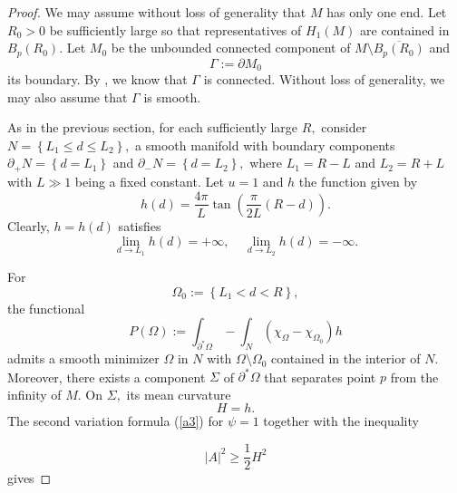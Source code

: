 \documentclass{amsart}
\numberwithin{equation}{section}
\begin{document}
\begin{proof}
We may assume without loss of generality that $M$ has only one end.  Let $R_0>0$ be sufficiently large so that representatives of $H_1 (M)$ are
contained in $B_p(R_0)$. Let $M_0$ be the unbounded connected component of $M\setminus \overline{ B_p (R_0)}$ and  $$\Gamma:= \partial M_0$$ its boundary. By \cite{LT}, we know that $\Gamma$ is connected. Without loss of generality, we may also assume that $\Gamma$ is smooth.  

 As in the previous section, for each sufficiently large $R,$ 
consider $N=\left\{ L_1\leq d\leq L_2\right\},$ 
a smooth manifold with boundary components $\partial _{+}N=\left\{d=L_1\right\} $ and 
$\partial _{-}N=\left\{ d=L_2\right\},$ where $L_1=R-L$ and $L_2=R+L$ with $L\gg 1$ being 
a fixed constant. Let $u=1$ and  $h$ the function given by
\begin{equation*}
h\left( d\right) =\frac{4\pi }{L}\tan \left( \frac{\pi }{2L}(R-d)\right). 
\end{equation*}
Clearly,   $h=h\left( d\right) $ satisfies
\begin{equation*}
\lim_{d\rightarrow L_1}h\left( d\right) =+\infty ,\ \ \ \ \
\lim_{d\rightarrow L_2}h\left( d\right) =-\infty .
\end{equation*}

For 
\begin{equation*}
\Omega _{0}:=\left\{ L_1<d<R\right\}, 
\end{equation*}
the functional
\begin{equation*}
P\left( \Omega \right) :=\int_{\partial ^{\ast }\Omega }-\int_{N}\left( \chi
_{\Omega }-\chi _{\Omega _{0}}\right) h
\end{equation*}
admits a smooth minimizer $\Omega$ in $N$ with $\Omega\setminus \Omega_0$ contained in the 
interior of $N.$ Moreover, there exists a component $\Sigma$ of  $\partial ^{\ast }\Omega$
that separates point $p$ from the infinity of $M.$ 
On $\Sigma,$ its mean curvature
\begin{equation}
H=h.  \label{z0}
\end{equation}
The second variation formula (\ref{a3}) for $\psi =1$ together with the inequality 

\begin{equation*}
|A|^2\geq \frac{1}{2}H^2
\end{equation*}
gives


\end{proof}
\end{document}
